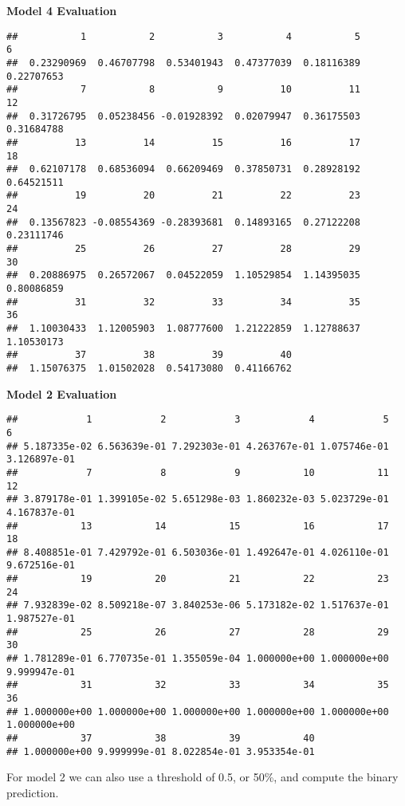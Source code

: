\documentclass[
]{article}
\begin{document}
\textbf{Model 4 Evaluation}

\begin{verbatim}
##           1           2           3           4           5           6 
##  0.23290969  0.46707798  0.53401943  0.47377039  0.18116389  0.22707653 
##           7           8           9          10          11          12 
##  0.31726795  0.05238456 -0.01928392  0.02079947  0.36175503  0.31684788 
##          13          14          15          16          17          18 
##  0.62107178  0.68536094  0.66209469  0.37850731  0.28928192  0.64521511 
##          19          20          21          22          23          24 
##  0.13567823 -0.08554369 -0.28393681  0.14893165  0.27122208  0.23111746 
##          25          26          27          28          29          30 
##  0.20886975  0.26572067  0.04522059  1.10529854  1.14395035  0.80086859 
##          31          32          33          34          35          36 
##  1.10030433  1.12005903  1.08777600  1.21222859  1.12788637  1.10530173 
##          37          38          39          40 
##  1.15076375  1.01502028  0.54173080  0.41166762
\end{verbatim}

\textbf{Model 2 Evaluation}

\begin{verbatim}
##            1            2            3            4            5            6 
## 5.187335e-02 6.563639e-01 7.292303e-01 4.263767e-01 1.075746e-01 3.126897e-01 
##            7            8            9           10           11           12 
## 3.879178e-01 1.399105e-02 5.651298e-03 1.860232e-03 5.023729e-01 4.167837e-01 
##           13           14           15           16           17           18 
## 8.408851e-01 7.429792e-01 6.503036e-01 1.492647e-01 4.026110e-01 9.672516e-01 
##           19           20           21           22           23           24 
## 7.932839e-02 8.509218e-07 3.840253e-06 5.173182e-02 1.517637e-01 1.987527e-01 
##           25           26           27           28           29           30 
## 1.781289e-01 6.770735e-01 1.355059e-04 1.000000e+00 1.000000e+00 9.999947e-01 
##           31           32           33           34           35           36 
## 1.000000e+00 1.000000e+00 1.000000e+00 1.000000e+00 1.000000e+00 1.000000e+00 
##           37           38           39           40 
## 1.000000e+00 9.999999e-01 8.022854e-01 3.953354e-01
\end{verbatim}

For model 2 we can also use a threshold of 0.5, or 50\%, and compute the
binary prediction.
\end{document}
